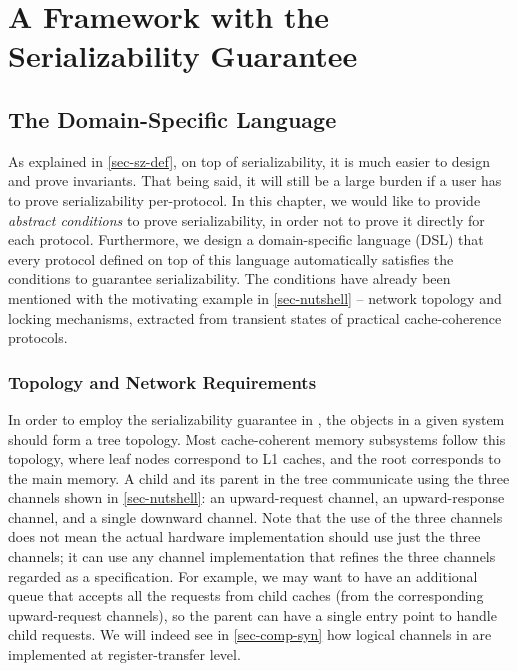 \part{A Framework with the Serializability Guarantee}

\chapter{The \hemiola{} Domain-Specific Language}
\label{sec-hemiola-dsl}

As explained in \autoref{sec-sz-def}, on top of serializability, it is much easier to design and prove invariants.
That being said, it will still be a large burden if a user has to prove serializability per-protocol.
In this chapter, we would like to provide \emph{abstract conditions} to prove serializability, in order not to prove it directly for each protocol.
Furthermore, we design a domain-specific language (DSL) that every protocol defined on top of this language automatically satisfies the conditions to guarantee serializability.
The conditions have already been mentioned with the motivating example in \autoref{sec-nutshell} -- network topology and locking mechanisms, extracted from transient states of practical cache-coherence protocols.

\section{Topology and Network Requirements}
\label{sec-topo-net-reqs}

In order to employ the serializability guarantee in \hemiola{}, the objects in a given system should form a tree topology.
Most cache-coherent memory subsystems follow this topology, where leaf nodes correspond to L1 caches, and the root corresponds to the main memory.
A child and its parent in the tree communicate using the three channels shown in \autoref{sec-nutshell}: an upward-request channel, an upward-response channel, and a single downward channel.
Note that the use of the three channels does not mean the actual hardware implementation should use just the three channels; it can use any channel implementation that refines the three channels regarded as a specification.
For example, we may want to have an additional queue that accepts all the requests from child caches (from the corresponding upward-request channels), so the parent can have a single entry point to handle child requests.
We will indeed see in \autoref{sec-comp-syn} how logical channels in \hemiola{} are implemented at register-transfer level.

